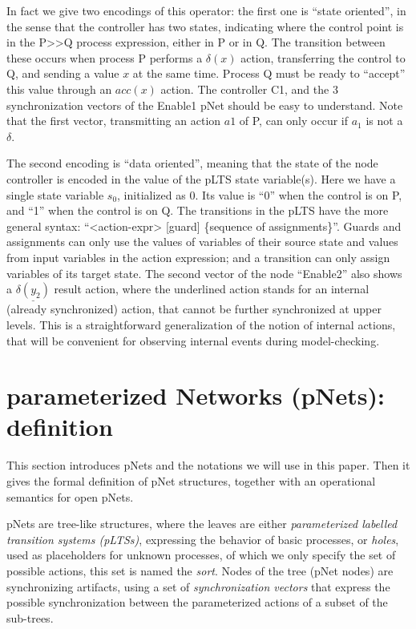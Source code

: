 \documentclass{lncs/llncs}
\newcommand{\ERIC}[1]{\textcolor{blue}{#1}}
\begin{document}
In fact we give two encodings of this operator: the first one is
``state oriented'', in the sense that the controller has two states,
indicating where the control point is in the P>>Q process expression,
either in P or in Q. The transition between these occurs when process
P performs a $\delta(x)$ action, transferring the control to Q, and
sending a value $x$ at the same time. Process Q must be ready to
``accept'' this value through an $acc(x)$ action. The controller C1,
and the 3 synchronization vectors of the Enable1 pNet should be easy
to understand. Note 
that the first vector, transmitting an action $a1$ of P, can only
occur if $a_1$ is not a $\delta$.

The second encoding is ``data oriented'', meaning that the state of
the node controller is encoded in the value of the pLTS state
variable(s). Here we have a single state variable $s_0$, initialized
as $0$. Its value is ``0'' when the control is on P, and ``1'' when the
control is on Q. The transitions in the pLTS have the more general
syntax: ``<action-expr> [guard] \{sequence of assignments\}''. Guards
and assignments can only use the values of variables of their source
state and values from input variables in the action expression; and a
transition can only assign variables of its target state. 
The second vector of the node ``Enable2'' also shows a
$\underline{\delta(y_2)}$ result action, where the underlined action
stands for an internal (already synchronized) action, that cannot be
further synchronized at upper levels. This is a straightforward
 generalization of the notion of internal actions, that will be
convenient for observing internal events during model-checking. 



\section{parameterized Networks (pNets): definition}
\label{section:pnets}


This section introduces pNets and the notations we will use in
this paper. Then it gives the formal definition of pNet structures,
together with an operational semantics for open pNets.

pNets are tree-like structures, where the leaves are either
\emph{parameterized labelled transition systems (pLTSs)}, expressing the
behavior of basic processes, or \emph{holes}, used as placeholders
for unknown processes, of which we only specify the set of possible
actions, this set is named the \emph{sort}.
Nodes of the tree (pNet nodes) are synchronizing artifacts, using a
set of \emph{synchronization vectors} that express the possible
synchronization between the parameterized actions of a subset of the
sub-trees.
\end{document}
